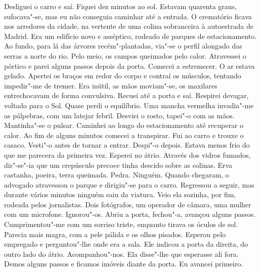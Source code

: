 Desliguei o carro e saí. Fiquei dez minutos ao sol. Estavam quarenta
graus, sufocava"-se, mas eu não conseguia caminhar até a entrada. O
crematório ficava nos arredores da cidade, na vertente de uma colina
sobranceira à autoestrada de Madrid. Era um edifício novo e asséptico,
rodeado de parques de estacionamento. Ao fundo, para lá das árvores
recém"-plantadas, via"-se o perfil alongado das serras a norte do rio.
Pelo meio, os campos queimados pelo calor. Atravessei o pórtico e parei
alguns passos depois da porta. Comecei a estremecer. O ar estava gelado.
Apertei os braços em redor do corpo e contraí os músculos, tentando
impedir"-me de tremer. Era inútil, as mãos moviam"-se, os maxilares
entrechocavam de forma convulsiva. Recuei até a porta e saí. Respirei
devagar, voltado para o Sol. Quase perdi o equilíbrio. Uma mancha
vermelha invadia"-me as pálpebras, com um latejar febril. Desviei o
rosto, tapei"-o com as mãos. Mantinha"-se o pulsar. Caminhei ao longo do
estacionamento até recuperar o calor. Ao fim de alguns minutos comecei a
transpirar. Fui ao carro e trouxe o casaco. Vesti"-o antes de tornar a
entrar. Despi"-o depois. Estava menos frio do que me parecera da
primeira vez. Esperei no átrio. Através dos vidros fumados, dir"-se"-ia
que um crepúsculo precoce tinha descido sobre as colinas. Erva castanha,
poeira, terra queimada. Pedra. Ninguém. Quando chegaram, o advogado
atravessou o parque e dirigiu"-se para o carro. Regressou a seguir, mas
durante vários minutos ninguém saiu da viatura. Veio ela sozinha, por
fim, rodeada pelos jornalistas. Dois fotógrafos, um operador de câmara,
uma mulher com um microfone. Ignorou"-os. Abriu a porta, fechou"-a,
avançou alguns passos. Cumprimentou"-me com um sorriso triste, enquanto
tirava os óculos de sol. Parecia mais magra, com a pele pálida e os
olhos pisados. Esperou pelo empregado e perguntou"-lhe onde era a sala.
Ele indicou a porta da direita, do outro lado do átrio. Acompanhou"-nos.
Ela disse"-lhe que esperasse ali fora. Demos alguns passos e ficamos
imóveis diante da porta. Eu avancei primeiro.

